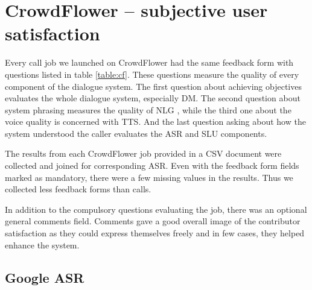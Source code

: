 \section{CrowdFlower -- subjective user satisfaction}

Every call job we launched on CrowdFlower had the same feedback form with questions listed in table \ref{table:cf}.
These questions measure the quality of every component of the dialogue system.
The first question about achieving objectives evaluates the whole dialogue system, especially \ac{DM}.
The second question about system phrasing measures the quality of \ac{NLG} , while the third one about the voice quality is concerned with \ac{TTS}.
And the last question asking about how the system understood the caller evaluates the \ac{ASR} and \ac{SLU} components.


\begin{table}[h]
\centering
\hspace*{-3pt}
\caption[CrowdFlower feedback form questions]{CrowdFlower feedback form questions with choice ranges.}
\label{table:cf}
\end{table}

The results from each CrowdFlower job provided in a \ac{CSV} document were collected and joined for corresponding \ac{ASR}.
Even with the feedback form fields marked as mandatory, there were a few missing values in the results.
Thus we collected less feedback forms than calls.

In addition to the compulsory questions evaluating the job, there was an optional general comments field.
Comments gave a good overall image of the contributor satisfaction as they could express themselves freely and in few cases, they helped enhance the system.

\subsection{Google \acs{ASR}}

